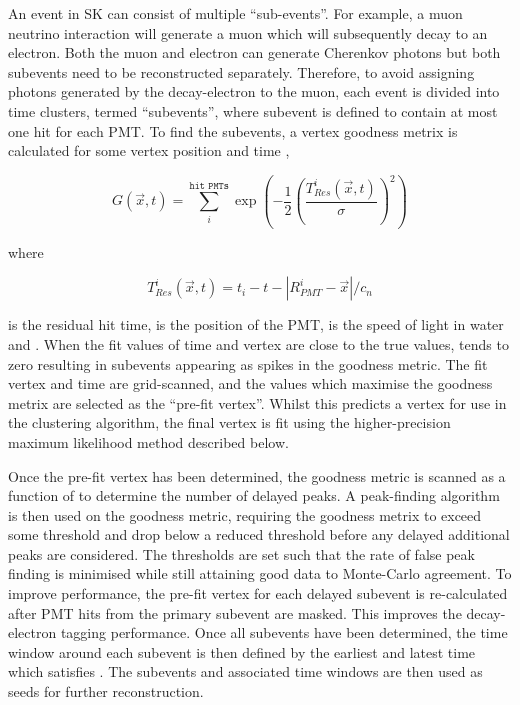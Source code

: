 An event in SK can consist of multiple ``sub-events''. For example, a muon neutrino interaction will generate a muon which will subsequently decay to an electron. Both the muon and electron can generate Cherenkov photons but both subevents need to be reconstructed separately. Therefore, to avoid assigning photons generated by the decay-electron to the muon, each event is divided into time clusters, termed ``subevents'', where subevent is defined to contain at most one hit for each PMT. To find the subevents, a vertex goodness metrix is calculated for some vertex position  and time ,

\begin{equation}
  G(\vec{x},t) = \sum^{\texttt{hit PMTs}}_{i} \exp \left( - \frac{1}{2} \left( \frac{T_{Res}^{i}(\vec{x},t)}{\sigma} \right)^{2} \right)
\end{equation}

where

\begin{equation}
  T_{Res}^{i}(\vec{x},t) = t_{i} - t - \left| R^{i}_{PMT} - \vec{x} \right|/c_{n}
\end{equation}

is the residual hit time,  is the position of the  PMT,  is the speed of light in water and  . When the fit values of time and vertex are close to the true values,  tends to zero resulting in subevents appearing as spikes in the goodness metric. The fit vertex and time are grid-scanned, and the values which maximise the goodness metrix are selected as the ``pre-fit vertex''. Whilst this predicts a vertex for use in the clustering algorithm, the final vertex is fit using the higher-precision maximum likelihood method described below.

Once the pre-fit vertex has been determined, the goodness metric is scanned as a function of  to determine the number of delayed peaks. A peak-finding algorithm is then used on the goodness metric, requiring the goodness metrix to exceed some threshold and drop below a reduced threshold before any delayed additional peaks are considered. The thresholds are set such that the rate of false peak finding is minimised while still attaining good data to Monte-Carlo agreement. To improve performance, the pre-fit vertex for each delayed subevent is re-calculated after PMT hits from the primary subevent are masked. This improves the decay-electron tagging performance. Once all subevents have been determined, the time window around each subevent is then defined by the earliest and latest time which satisfies . The subevents and associated time windows are then used as seeds for further reconstruction.


